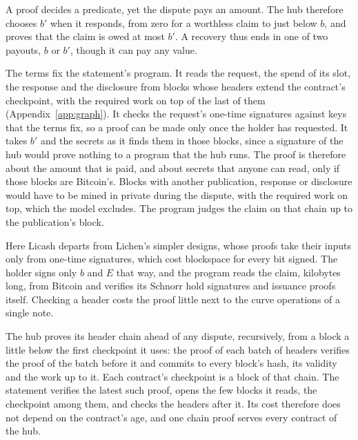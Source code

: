 \documentclass[11pt]{article}
\newcommand{\bresp}{b'}
\begin{document}
A proof decides a predicate, yet the dispute pays an amount. The hub therefore chooses $\bresp$ when it responds, from zero for a worthless claim to just below $b$, and proves that the claim is owed at most $\bresp$. A recovery thus ends in one of two payouts, $b$ or $\bresp$, though it can pay any value.

The terms fix the statement's program. It reads the request, the spend of its slot, the response and the disclosure from blocks whose headers extend the contract's checkpoint, with the required work on top of the last of them (Appendix~\ref{app:graph}). It checks the request's one-time signatures against keys that the terms fix, so a proof can be made only once the holder has requested. It takes $\bresp$ and the secrets as it finds them in those blocks, since a signature of the hub would prove nothing to a program that the hub runs. The proof is therefore about the amount that is paid, and about secrets that anyone can read, only if those blocks are Bitcoin's. Blocks with another publication, response or disclosure would have to be mined in private during the dispute, with the required work on top, which the model excludes. The program judges the claim on that chain up to the publication's block.

Here Licash departs from Lichen's simpler designs, whose proofs take their inputs only from one-time signatures, which cost blockspace for every bit signed. The holder signs only $b$ and $E$ that way, and the program reads the claim, kilobytes long, from Bitcoin and verifies its Schnorr hold signatures and issuance proofs itself. Checking a header costs the proof little next to the curve operations of a single note.

The hub proves its header chain ahead of any dispute, recursively, from a block a little below the first checkpoint it uses: the proof of each batch of headers verifies the proof of the batch before it and commits to every block's hash, its validity and the work up to it. Each contract's checkpoint is a block of that chain. The statement verifies the latest such proof, opens the few blocks it reads, the checkpoint among them, and checks the headers after it. Its cost therefore does not depend on the contract's age, and one chain proof serves every contract of the hub.
\end{document}
